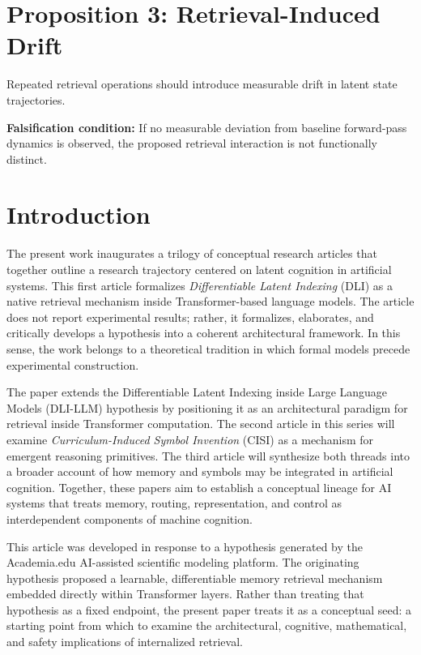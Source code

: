 \section*{Proposition 3: Retrieval-Induced Drift}
Repeated retrieval operations should introduce measurable drift in latent state trajectories.

\textbf{Falsification condition:} If no measurable deviation from baseline forward-pass dynamics is observed, the proposed retrieval interaction is not functionally distinct.

\section*{Introduction}
The present work inaugurates a trilogy of conceptual research articles that together outline a research trajectory centered on latent cognition in artificial systems. This first article formalizes \textit{Differentiable Latent Indexing} (DLI) as a native retrieval mechanism inside Transformer-based language models. The article does not report experimental results; rather, it formalizes, elaborates, and critically develops a hypothesis into a coherent architectural framework. In this sense, the work belongs to a theoretical tradition in which formal models precede experimental construction.

The paper extends the Differentiable Latent Indexing inside Large Language Models (DLI-LLM) hypothesis by positioning it as an architectural paradigm for retrieval inside Transformer computation. The second article in this series will examine \textit{Curriculum-Induced Symbol Invention} (CISI) as a mechanism for emergent reasoning primitives. The third article will synthesize both threads into a broader account of how memory and symbols may be integrated in artificial cognition. Together, these papers aim to establish a conceptual lineage for AI systems that treats memory, routing, representation, and control as interdependent components of machine cognition.

This article was developed in response to a hypothesis generated by the Academia.edu AI-assisted scientific modeling platform. The originating hypothesis proposed a learnable, differentiable memory retrieval mechanism embedded directly within Transformer layers. Rather than treating that hypothesis as a fixed endpoint, the present paper treats it as a conceptual seed: a starting point from which to examine the architectural, cognitive, mathematical, and safety implications of internalized retrieval.

